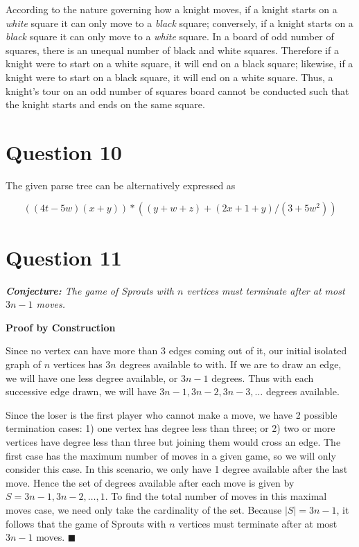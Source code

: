 \documentclass[11pt, oneside]{article}   	%
\newcommand*{\QEDA}{\hfill\ensuremath{\blacksquare}}         %
\begin{document}
According to the nature governing how a knight moves, if a knight starts on a \textit{white} square it can only move to a \textit{black} square; conversely, if a knight starts on a \textit{black} square it can only move to a \textit{white} square. In a board of odd number of squares, there is an unequal number of black and white squares. Therefore if a knight were to start on a white square, it will end on a  black square; likewise, if a knight were to start on a black square, it will end on a white square. Thus, a knight's tour on an odd number of squares board cannot be conducted such that the knight starts and ends on the same square.

\cleardoublepage
\section*{Question 10}

The given parse tree can be alternatively expressed as

$$((4t-5w)(x+y))*((y+w+z)+(2x+1+y)/(3+5w^2))$$



\section*{Question 11}

\textit{\textbf{Conjecture:} The game of Sprouts with $n$ vertices must terminate after at most $3n-1$ moves.}

\textbf{Proof by Construction}

Since no vertex can have more than 3 edges coming out of it, our initial isolated graph of $n$ vertices has $3n$ degrees available to  with. If we are to draw an edge, we will have one less degree available, or $3n-1$ degrees. Thus with each successive edge drawn, we will have $3n-1, 3n-2, 3n-3, \ldots$ degrees available.

Since the loser is the first player who cannot make a move, we have 2 possible termination cases: 1) one vertex has degree less than three; or 2) two or more vertices have degree less than three but joining them would cross an edge. The first case has the maximum number of moves in a given game, so we will only consider this case. In this scenario, we only have 1 degree available after the last move. Hence the set of degrees available after each move is given by $S = {3n-1, 3n-2, \ldots , 1}$. To find the total number of moves in this maximal moves case, we need only take the cardinality of the set. Because $|S| = 3n-1$, it follows that the game of Sprouts with $n$ vertices must terminate after at most $3n-1$ moves. \QEDA 
\end{document}
